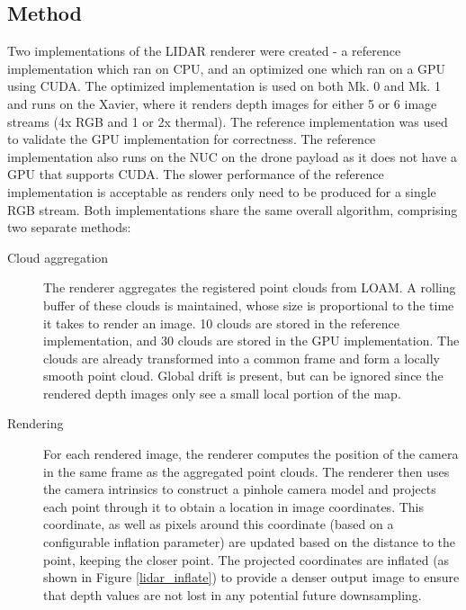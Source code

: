 \subsection{Method}

Two implementations of the LIDAR renderer were created - a reference implementation which ran on CPU, and an optimized one which ran on a GPU using CUDA. The optimized implementation is used on both Mk. 0 and Mk. 1 and runs on the Xavier, where it renders depth images for either 5 or 6 image streams (4x RGB and 1 or 2x thermal). The reference implementation was used to validate the GPU implementation for correctness. The reference implementation also runs on the NUC on the drone payload as it does not have a GPU that supports CUDA. The slower performance of the reference implementation is acceptable as renders only need to be produced for a single RGB stream. Both implementations share the same overall algorithm, comprising two separate methods:

\begin{description}
	\item[Cloud aggregation] The renderer aggregates the registered point clouds from LOAM. A rolling buffer of these clouds is maintained, whose size is proportional to the time it takes to render an image. 10 clouds are stored in the reference implementation, and 30 clouds are stored in the GPU implementation. The clouds are already transformed into a common frame and form a locally smooth point cloud. Global drift is present, but can be ignored since the rendered depth images only see a small local portion of the map.
	\item[Rendering] For each rendered image, the renderer computes the position of the camera in the same frame as the aggregated point clouds. The renderer then uses the camera intrinsics to construct a pinhole camera model and projects each point through it to obtain a location in image coordinates. This coordinate, as well as pixels around this coordinate (based on a configurable inflation parameter) are updated based on the distance to the point, keeping the closer point. The projected coordinates are inflated (as shown in Figure \ref{lidar_inflate}) to provide a denser output image to ensure that depth values are not lost in any potential future downsampling.
\end{description}

